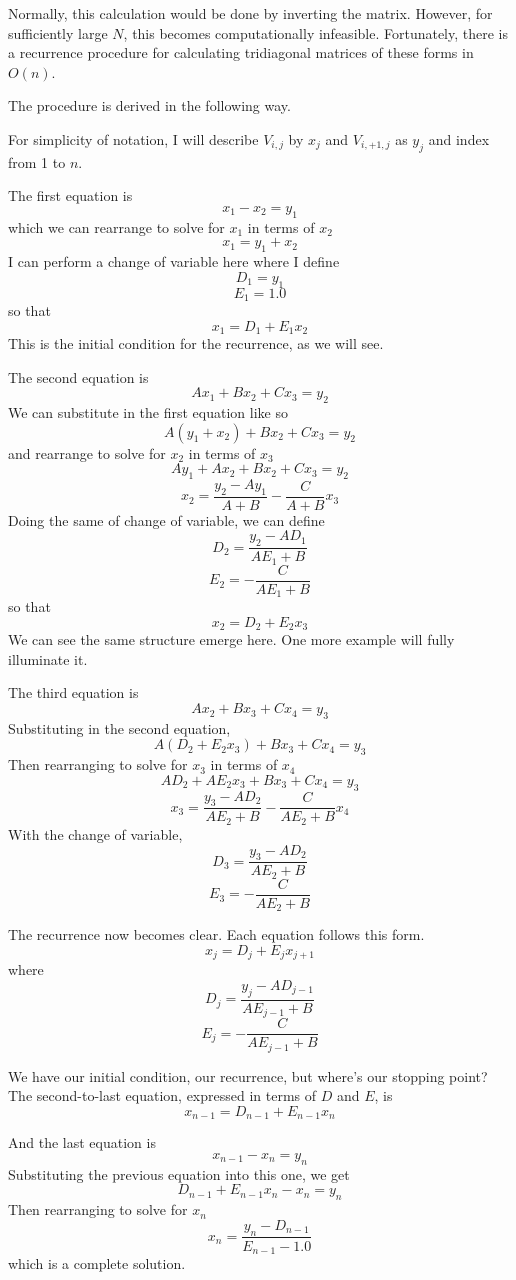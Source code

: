 \documentclass[11pt]{article}
\begin{document}
Normally, this calculation would be done by inverting the matrix.
However, for sufficiently large \(N\), this becomes computationally
infeasible. Fortunately, there is a recurrence procedure for calculating
tridiagonal matrices of these forms in \(O(n)\).

    The procedure is derived in the following way.

For simplicity of notation, I will describe \(V_{i, j}\) by \(x_j\) and
\(V_{i, + 1, j}\) as \(y_j\) and index from 1 to \(n\).

The first equation is \[x_1 - x_2 = y_1\] which we can rearrange to
solve for \(x_1\) in terms of \(x_2\) \[x_1 = y_1 + x_2\] I can perform
a change of variable here where I define \[D_1 = y_1\] \[E_1 = 1.0\] so
that \[x_1 = D_1 + E_1 x_2\] This is the initial condition for the
recurrence, as we will see.

The second equation is \[Ax_1 + Bx_2 + Cx_3 = y_2\] We can substitute in
the first equation like so \[A(y_1 + x_2) + Bx_2 + Cx_3 = y_2\] and
rearrange to solve for \(x_2\) in terms of \(x_3\)
\[Ay_1 + Ax_2 + Bx_2 + Cx_3 = y_2\]
\[x_2 = \frac{y_2 - Ay_1}{A + B} - \frac{C}{A + B}x_3\] Doing the same
of change of variable, we can define
\[D_2 = \frac{y_2 - AD_1}{AE_1 + B}\] \[E_2 = -\frac{C}{AE_1 + B}\] so
that \[x_2 = D_2 + E_2 x_3\] We can see the same structure emerge here.
One more example will fully illuminate it.

The third equation is \[Ax_2 + Bx_3 + Cx_4 = y_3\] Substituting in the
second equation, \[A(D_2 + E_2 x_3) + Bx_3 + Cx_4 = y_3\] Then
rearranging to solve for \(x_3\) in terms of \(x_4\)
\[AD_2 + AE_2 x_3 + Bx_3 + Cx_4 = y_3\]
\[x_3 = \frac{y_3 - AD_2}{AE_2 + B} - \frac{C}{AE_2 + B}x_4\] With the
change of variable, \[D_3 = \frac{y_3 - AD_2}{AE_2 + B}\]
\[E_3 = -\frac{C}{AE_2 + B}\]

The recurrence now becomes clear. Each equation follows this form.
\[x_j = D_j + E_j x_{j+1}\] where
\[D_j = \frac{y_j - AD_{j - 1}}{AE_{j - 1} + B}\]
\[E_j = -\frac{C}{AE_{j - 1} + B}\]

We have our initial condition, our recurrence, but where's our stopping
point? The second-to-last equation, expressed in terms of \(D\) and
\(E\), is \[x_{n-1} = D_{n-1} + E_{n-1} x_n\]

And the last equation is \[x_{n-1} - x_n = y_n\] Substituting the
previous equation into this one, we get
\[D_{n-1} + E_{n-1} x_n - x_n = y_n\] Then rearranging to solve for
\(x_n\) \[x_n = \frac{y_n - D_{n-1}}{E_{n-1} - 1.0}\] which is a
complete solution.
\end{document}
